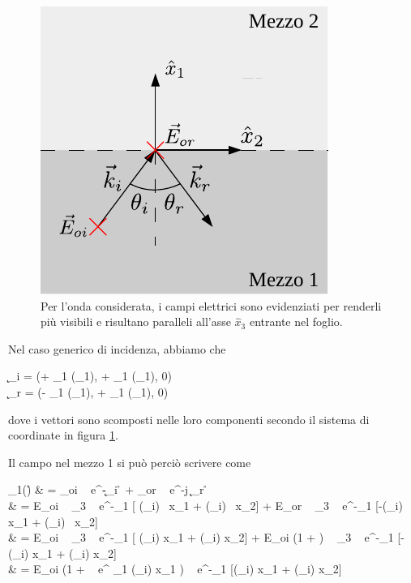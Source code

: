 	\begin{figure}[ht]
		\centering
		\includegraphics{img/campi_incidenza_non_normale.pdf}
		 \caption{Per l'onda considerata, i campi elettrici sono evidenziati per renderli più visibili e risultano paralleli all'asse $\hat{x}_3$ entrante nel foglio.}
		\label{fig:campi_incidenza_non_normale_isolanti}
	\end{figure}

	Nel caso generico di incidenza, abbiamo che
	\begin{esp}
		\begin{dcases}
			\k_i = (+ \beta_1 \cos(\theta_1), + \beta_1 \sin(\theta_1), 0) \\
			\k_r = (- \beta_1 \cos(\theta_1), + \beta_1 \sin(\theta_1), 0)
		\end{dcases}
	\end{esp}
	dove i vettori sono scomposti nelle loro componenti secondo il sistema di coordinate in figura \ref{fig:campi_incidenza_non_normale_isolanti}.

	Il campo nel mezzo 1 si può perciò scrivere come
	\begin{esp}
		\E_1(\r)
		& = \E_{oi} ~ e^{-\jmath \k_i \cdot \r} + \E_{or} ~ e^{-j \k_r \cdot \r} \\
		& = E_{oi} ~ \hat{x}_3
			~ e^{-\jmath \beta_1 [ \cos(\theta_i) \, x_1 + \sin(\theta_i) \, x_2] }
			+ E_{or} ~ \hat{x}_3
			~ e^{-\jmath \beta_1 [-\cos(\theta_i) \, x_1 + \sin(\theta_i) \, x_2] } \\
		& = E_{oi} ~ \hat{x}_3
			~ e^{-\jmath \beta_1 [ \cos(\theta_i) x_1 + \sin(\theta_i) x_2] }
			+ E_{oi} (1 + \rho)
			~ _3 ~ e^{-\jmath \beta_1 [-\cos(\theta_i) x_1 + \sin(\theta_i) x_2]} \\
		& = E_{oi} (1 + \rho ~ e^{ \beta_1 \cos(\theta_i) x_1} )
			~ e^{-\jmath \beta_1 [\cos(\theta_i) x_1 + \sin(\theta_i) x_2]} \\
	\end{esp}

